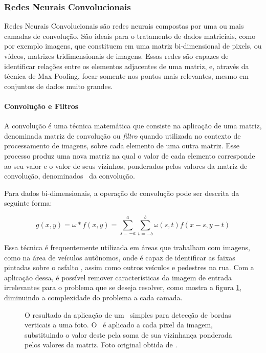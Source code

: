 \subsubsection{Redes Neurais Convolucionais}
\label{sec:convnet}

Redes Neurais Convolucionais são redes neurais compostas por uma ou mais camadas de convolução.
São ideais para o tratamento de dados matriciais, como por exemplo imagens, que constituem em uma matriz bi-dimensional de pixels, ou vídeos, matrizes tridimensionais de imagens.
Essas redes são capazes de identificar relações entre os elementos adjacentes de uma matriz, e, através da técnica de Max Pooling, focar somente nos pontos mais relevantes, mesmo em conjuntos de dados muito grandes.

\paragraph{Convolução e Filtros}
\label{sec:convolution}

A convolução é uma técnica matemática que consiste na aplicação de uma matriz, denominada matriz de convolução ou \textit{filtro} quando utilizada no contexto de processamento de imagens, sobre cada elemento de uma outra matriz.
Esse processo produz uma nova matriz na qual o valor de cada elemento corresponde ao seu valor e o valor de seus vizinhos, ponderados pelos valores da matriz de convolução, denominados \ da convolução.

Para dados bi-dimensionais, a operação de convolução pode ser descrita da seguinte forma:

\begin{equation}
    g(x,y) = \omega * f(x,y) = \sum\limits_{s=-a}^a\sum\limits_{t=-b}^b\omega(s,t)f(x-s, y-t)
\end{equation}

Essa técnica é frequentemente utilizada em áreas que trabalham com imagens, como na área de veículos autônomos, onde é capaz de identificar as faixas pintadas sobre o asfalto \cite{peddagollaLaneDetectionAutonomous}, assim como outros veículos e pedestres na rua.
Com a aplicação dessa, é possível remover características da imagem de entrada irrelevantes para o problema que se deseja resolver, como mostra a figura \ref{fig:conv}, diminuindo a complexidade do problema a cada camada.

\begin{figure}[ht]
    \centering
    
    \caption{O resultado da aplicação de um \ simples para detecção de bordas verticais a uma foto. 
    O \ é aplicado a cada pixel da imagem, substituindo o valor deste pela soma de sua vizinhança ponderada pelos valores da matriz. 
    Foto original obtida de \cite{diliffEnglishLookingEast2015}.}
    \label{fig:conv}
\end{figure}

